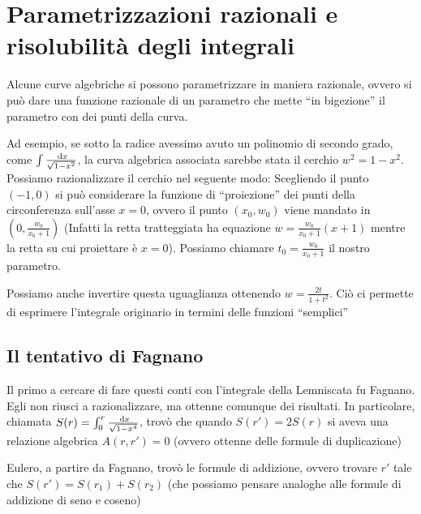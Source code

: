 
\section{Parametrizzazioni razionali e risolubilità degli integrali}
Alcune curve algebriche si possono parametrizzare in maniera razionale, ovvero si può dare una funzione razionale di un parametro che mette
``in bigezione'' il parametro con dei punti della curva.

Ad esempio, se sotto la radice avessimo avuto un polinomio di secondo grado, come $ \int \frac{\text{ d} x}{\sqrt{1 - x^2}} $, la curva algebrica
associata sarebbe stata il cerchio $w^2 = 1 - x^2$. Possiamo razionalizzare il cerchio nel seguente modo:
Scegliendo il punto $(-1, 0)$ si può considerare la funzione di ``proiezione'' dei punti della circonferenza sull'asse $x=0$, ovvero il
punto $(x_0, w_0)$ viene mandato in $(0, \frac{w_0}{x_0 + 1})$ (Infatti la retta tratteggiata ha equazione $w = \frac{w_0}{x_0 + 1} (x + 1)$
mentre la retta su cui proiettare è $x=0$). Possiamo chiamare $t_0 = \frac{w_0}{x_0 + 1}$ il nostro parametro.

Possiamo anche invertire questa uguaglianza ottenendo $w = \frac{2 t}{1 + t^2}$. Ciò ci permette di esprimere l'integrale originario in
termini delle funzioni ``semplici''

\subsection{Il tentativo di Fagnano}
Il primo a cercare di fare questi conti con l'integrale della Lemniscata fu Fagnano. Egli non riusci a razionalizzare, ma ottenne comunque
dei risultati. In particolare, chiamata $S(r) = \int_0^r \frac{\text{ d} x}{\sqrt{1 - x^4}}$, trovò che quando $S(r') = 2 S(r)$ si aveva una
relazione algebrica $A(r, r') = 0$ (ovvero ottenne delle formule di duplicazione)

Eulero, a partire da Fagnano, trovò le formule di addizione, ovvero trovare $r'$ tale che $S(r') = S(r_1) + S(r_2)$ (che possiamo pensare
analoghe alle formule di addizione di seno e coseno)

